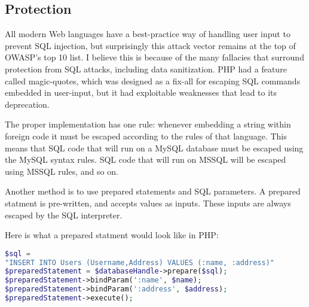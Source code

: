 \subsection{Protection}

All modern Web languages have a best-practice way of handling user input to prevent SQL injection, but surprisingly this attack vector remains at the top of OWASP's top 10 list. I believe this is because of the many fallacies that surround protection from SQL attacks, including data sanitization. PHP had a feature called magic-quotes, which was designed as a fix-all for escaping SQL commands embedded in user-input, but it had exploitable weaknesses that lead to its deprecation.

The proper implementation has one rule: whenever embedding a string within foreign code it must be escaped according to the rules of that language. This means that SQL code that will run on a MySQL database must be escaped using the MySQL syntax rules. SQL code that will run on MSSQL will be escaped using MSSQL rules, and so on.
 
Another method is to use prepared statements and SQL parameters. A prepared statment is pre-written, and accepts values as inputs. These inputs are always escaped by the SQL interpreter. 

Here is what a prepared statment would look like in PHP:
\begin{lstlisting}[language = PHP]
$sql = 
"INSERT INTO Users (Username,Address) VALUES (:name, :address)"
$preparedStatement = $databaseHandle->prepare($sql);
$preparedStatement->bindParam(':name', $name);
$preparedStatement->bindParam(':address', $address);
$preparedStatement->execute();
\end{lstlisting}